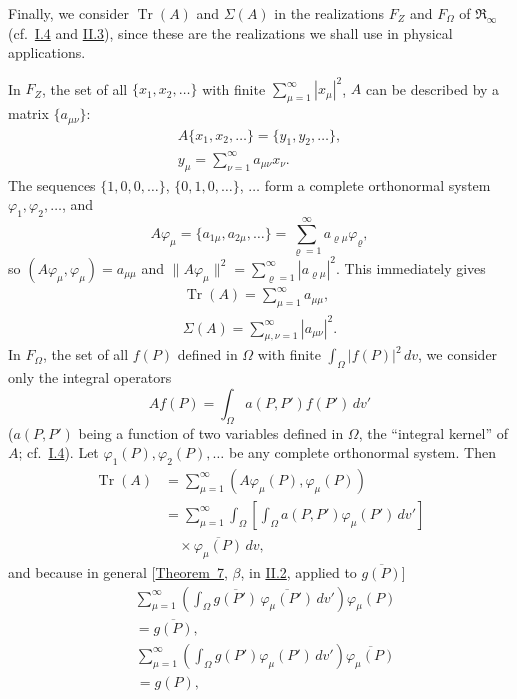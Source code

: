 \documentclass[fontsize=13pt,twoside,openany,headings=normal,parskip=false,bookmarkpackage=false,DIV=calc]{scrbook}
\begin{document}
Finally, we consider $\operatorname{Tr}(A)$ and $\Sigma(A)$ in the realizations $F_Z$ and $F_\Omega$ of $\mathfrak R_\infty$ (cf.\ \hyperref[sec:I.4]{I.4} and \hyperref[sec:II.3]{II.3}), since these are the realizations we shall use in physical applications.

In $F_Z$, the set of all $\{x_1,x_2,\ldots\}$ with finite $\sum_{\mu=1}^{\infty}|x_\mu|^2$, $A$ can be described by a matrix $\{a_{\mu\nu}\}$:
\begin{gather*}
A\{x_1,x_2,\ldots\}=\{y_1,y_2,\ldots\},\\
 y_\mu=\sum_{\nu=1}^{\infty}a_{\mu\nu}x_\nu.
\end{gather*}
The sequences $\{1,0,0,\ldots\}$, $\{0,1,0,\ldots\}$, $\ldots$ form a complete orthonormal system $\varphi_1,\varphi_2,\ldots$, and
\[
A\varphi_\mu=\{a_{1\mu},a_{2\mu},\ldots\}
=\sum_{\varrho=1}^{\infty}a_{\varrho\mu}\varphi_\varrho,
\]
so $(A\varphi_\mu,\varphi_\mu)=a_{\mu\mu}$ and $\|A\varphi_\mu\|^2=\sum_{\varrho=1}^{\infty}|a_{\varrho\mu}|^2$. This immediately gives
\begin{gather*}
\operatorname{Tr}(A)=\sum_{\mu=1}^{\infty}a_{\mu\mu},\\
\Sigma(A)=\sum_{\mu,\nu=1}^{\infty}|a_{\mu\nu}|^2.
\end{gather*}
In $F_\Omega$, the set of all $f(P)$ defined in $\Omega$ with finite $\int_\Omega|f(P)|^2\,dv$, we consider only the integral operators
\[
Af(P)=\int_\Omega a(P,P')f(P')\,dv'
\]
($a(P,P')$ being a function of two variables defined in $\Omega$, the ``integral kernel'' of $A$; cf.\ \hyperref[sec:I.4]{I.4}). Let $\varphi_1(P),\varphi_2(P),\ldots$ be any complete orthonormal system. Then
\begin{align*}
\operatorname{Tr}(A)
&=\sum_{\mu=1}^{\infty}(A\varphi_\mu(P),\varphi_\mu(P))\\
&=\sum_{\mu=1}^{\infty}\int_\Omega
\left[\int_\Omega a(P,P')\varphi_\mu(P')\,dv'\right]\\
&\quad\times\overline{\varphi_\mu(P)}\,dv,
\end{align*}
\hypertarget{origpage-101}{}%
and because in general [\hyperref[thm:II.7]{Theorem~7}, $\beta$, in \hyperref[sec:II.2]{II.2}, applied to $\overline{g(P)}$]
\begin{align*}
&\sum_{\mu=1}^{\infty}\left(\int_\Omega\overline{g(P')}\,
\overline{\varphi_\mu(P')}\,dv'\right)\varphi_\mu(P)\\
&=\overline{g(P)},
\end{align*}
\begin{align*}
&\sum_{\mu=1}^{\infty}\left(\int_\Omega g(P')\varphi_\mu(P')\,dv'\right)
\overline{\varphi_\mu(P)}\\
&=g(P),
\end{align*}
\end{document}
